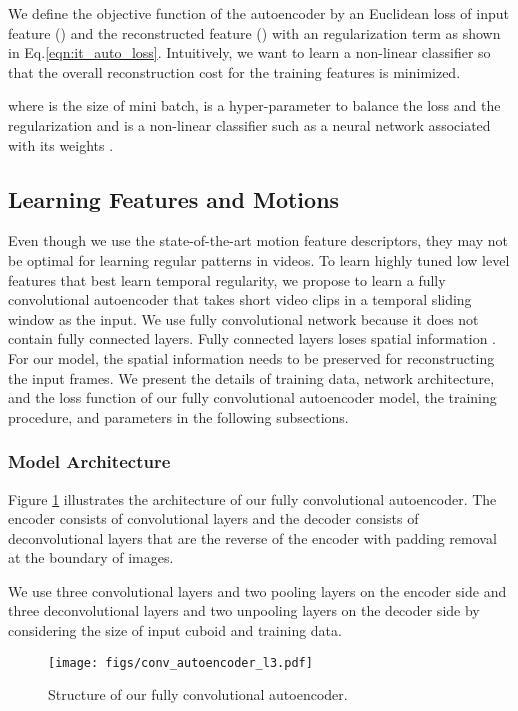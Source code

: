 \documentclass[10pt,twocolumn,letterpaper]{article}
\begin{document}
We define the objective function of the autoencoder by an Euclidean loss of input feature () and the reconstructed feature () with an  regularization term as shown in Eq.\ref{eqn:it_auto_loss}.
Intuitively, we want to learn a non-linear classifier so that the overall reconstruction cost for the  training features  is minimized.

where  is the size of mini batch,  is a hyper-parameter to balance the loss and the regularization and  is a non-linear classifier such as a neural network associated with its weights .



\subsection{Learning Features and Motions}

Even though we use the state-of-the-art motion feature descriptors, they may not be optimal for learning regular patterns in videos. 
To learn highly tuned low level features that best learn temporal regularity, we propose to learn a fully convolutional autoencoder that takes short video clips in a temporal sliding window as the input. 
We use fully convolutional network because it does not contain fully connected layers. 
Fully connected layers loses spatial information \cite{long2015fully}.  
For our model, the spatial information needs to be preserved for reconstructing the input frames.
We present the details of training data, network architecture, and the loss function of our fully convolutional autoencoder model, the training procedure, and parameters in the following subsections.


\subsubsection{Model Architecture}
Figure \ref{fig:conv_auto} illustrates the architecture of our fully convolutional autoencoder.
The encoder consists of convolutional layers \cite{krizhevsky2012imagenet} and the decoder consists of deconvolutional layers that are the reverse of the encoder with padding removal at the boundary of images. 

We use three convolutional layers and two pooling layers on the encoder side and three deconvolutional layers and two unpooling layers on the decoder side by considering the size of input cuboid and training data.

\begin{figure}[h]
	\centering
	\texttt{[image: figs/conv\_autoencoder\_l3.pdf]}
	\caption{Structure of our fully convolutional autoencoder.}
	\vspace{-2mm}
	\label{fig:conv_auto}
\end{figure}
\end{document}
